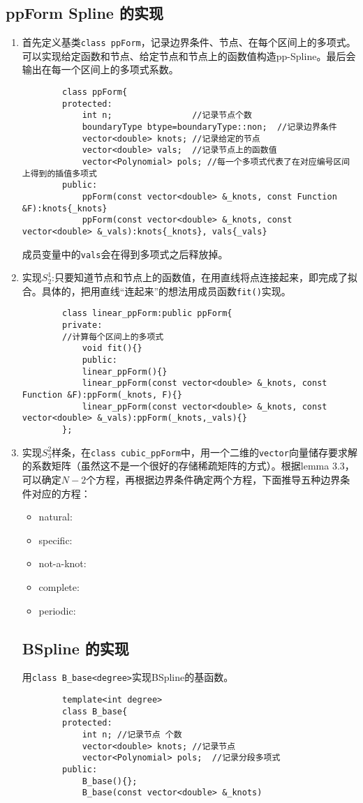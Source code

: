 \documentclass[UTF8]{ctexart}
\begin{document}
	\subsection{ppForm Spline 的实现}
	\begin{enumerate}
		\item 	首先定义基类\texttt{class ppForm}，记录边界条件、节点、在每个区间上的多项式。可以实现给定函数和节点、给定节点和节点上的函数值构造pp-Spline。最后会输出在每一个区间上的多项式系数。
		\begin{lstlisting}
		class ppForm{
		protected:
			int n;                //记录节点个数
			boundaryType btype=boundaryType::non;  //记录边界条件
			vector<double> knots; //记录给定的节点
			vector<double> vals;  //记录节点上的函数值
			vector<Polynomial> pols; //每一个多项式代表了在对应编号区间上得到的插值多项式
		public:
			ppForm(const vector<double> &_knots, const Function &F):knots{_knots}
			ppForm(const vector<double> &_knots, const vector<double> &_vals):knots{_knots}, vals{_vals}
		\end{lstlisting}
		成员变量中的\texttt{vals}会在得到多项式之后释放掉。
		\item 实现$S_2^1$:只要知道节点和节点上的函数值，在用直线将点连接起来，即完成了拟合。具体的，把用直线“连起来”的想法用成员函数\texttt{fit()}实现。
		\begin{lstlisting}
		class linear_ppForm:public ppForm{
		private:
		//计算每个区间上的多项式
			void fit(){}
			public:
			linear_ppForm(){}
			linear_ppForm(const vector<double> &_knots, const Function &F):ppForm(_knots, F){}
			linear_ppForm(const vector<double> &_knots, const vector<double> &_vals):ppForm(_knots,_vals){}
		};
		\end{lstlisting}
		\item 实现$S_3^2$样条，在\texttt{class cubic\_ppForm}中，用一个二维的\texttt{vector}向量储存要求解的系数矩阵（虽然这不是一个很好的存储稀疏矩阵的方式）。根据lemma 3.3，可以确定$N-2$个方程，再根据边界条件确定两个方程，下面推导五种边界条件对应的方程：
		\begin{itemize}
			\item natural:
			\item specific:
			\item not-a-knot:
			\item complete:
			\item periodic: 
		\end{itemize}
	\subsection{BSpline 的实现}
		用\texttt{class B\_base<degree>}实现BSpline的基函数。
		\begin{lstlisting}
		template<int degree>
		class B_base{
		protected:
			int n; //记录节点 个数
			vector<double> knots; //记录节点
			vector<Polynomial> pols;  //记录分段多项式
		public:
			B_base(){};
			B_base(const vector<double> &_knots)
				

\end{lstlisting}
\end{enumerate}
\end{document}
